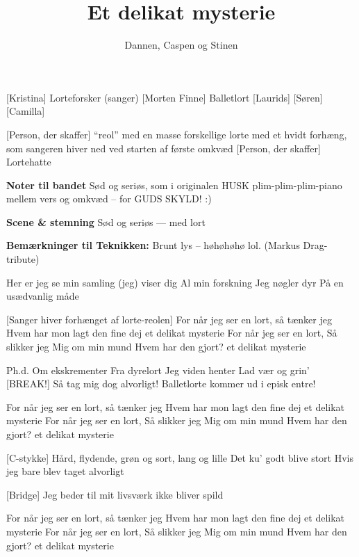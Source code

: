 \documentclass[a4paper,11pt]{article}
\title{Et delikat mysterie}
\author{Dannen, Caspen og Stinen}
\begin{document}
\maketitle

\begin{roles}
    [Kristina] Lorteforsker (sanger)
    [Morten Finne] Balletlort
    [Laurids]
    [Søren]
    [Camilla]
\end{roles}

\begin{props}
    [Person, der skaffer] ``reol'' med en masse forskellige lorte med et hvidt forhæng, som sangeren hiver ned ved starten af første omkvæd
    [Person, der skaffer] Lortehatte
\end{props}

\textbf{Noter til bandet}
Sød og seriøs, som i originalen
HUSK plim-plim-plim-piano mellem vers og omkvæd -- for GUDS SKYLD! :)

\textbf{Scene \& stemning}
Sød og seriøs --- med lort

\textbf{Bemærkninger til Teknikken:}
Brunt lys -- høhøhøhø lol. (Markus Drag-tribute)


\begin{song}
  Her er jeg
se min samling
(jeg) viser dig
Al min forskning
Jeg nøgler dyr
På en usædvanlig måde

  [Sanger hiver forhænget af lorte-reolen]
For når jeg ser en lort, så tænker jeg
Hvem har mon lagt 
den fine dej
et delikat mysterie
For når jeg ser en lort,
Så slikker jeg
Mig om min mund
Hvem har den gjort?
et delikat mysterie

  Ph.d.
Om ekskrementer
Fra dyrelort
Jeg viden henter
Lad vær og grin’
[BREAK!]
Så tag mig dog alvorligt!
\scene Balletlorte kommer ud i episk entre!

  For når jeg ser en lort, så tænker jeg
Hvem har mon lagt 
den fine dej
et delikat mysterie
For når jeg ser en lort,
Så slikker jeg
Mig om min mund
Hvem har den gjort?
et delikat mysterie
 
  [C-stykke]
  Hård, flydende, grøn og sort,
lang og lille
Det ku’ godt blive stort
Hvis jeg bare blev taget alvorligt

  [Bridge]
Jeg beder til
mit livsværk ikke bliver spild

  For når jeg ser en lort, så tænker jeg
Hvem har mon lagt 
den fine dej
et delikat mysterie
For når jeg ser en lort,
Så slikker jeg
Mig om min mund
Hvem har den gjort?
et delikat mysterie


\end{song}
\end{document}
